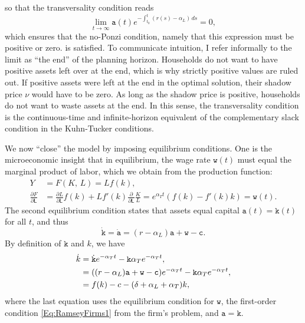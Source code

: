 \documentclass[10pt]{article}
\begin{document}
so that the transversality condition reads
\[
\lim_{t\to\infty} \mathtt{a}(t) e^{-\int_{t_0}^t (r(s)-\alpha_L)\, ds} = 0,
\]
which ensures that the no-Ponzi condition, namely that this expression must be positive or zero. is satisfied. To communicate intuition, I refer informally to the limit as ``the end'' of the planning horizon. Households do not want to have positive assets left over at the end, which is why strictly positive values are ruled out. If positive assets were left at the end in the optimal solution, their shadow price $\nu$ would have to be zero. As long as the shadow price is positive, households do not want to waste assets at the end. In this sense, the transversality condition is the continuous-time and infinite-horizon equivalent of the complementary slack condition in the Kuhn-Tucker conditions.

\smallskip

We now ``close'' the model by imposing equilibrium conditions.  One is the microeconomic insight that in equilibrium, the wage rate $\mathtt{w}(t)$ must equal the marginal product of labor, which we obtain from the production function:
\begin{align*}
Y &= F(K,\, L) = L f(k),\\
\frac{\partial F}{\partial \mathsf{L}} &= \frac{\partial L}{\partial \mathsf{L}} f(k) + L f'(k) \frac{\partial}{\partial\mathsf{L}} \frac{K}{L} = e^{\alpha_T t}(f(k)-f'(k)k) = \mathtt{w}(t).
\end{align*}
The second equilibrium condition states that assets equal capital $\mathtt{a}(t) = \mathtt{k}(t)$ for all $t$, and thus
\[
\dot{\mathtt{k}} = \dot{\mathtt{a}} = (r-\alpha_L) \mathtt{a} + \mathtt{w} - \mathtt{c}.
\]
By definition of $\mathtt{k}$ and $k$, we have
\begin{align}
\dot{k} &= \dot{\mathtt{k}} e^{-\alpha_T t} - \mathtt{k} \alpha_T e^{-\alpha_T t},\notag\\
 &= ((r-\alpha_L) \mathtt{a} + \mathtt{w} - \mathtt{c})e^{-\alpha_T t} - \mathtt{k} \alpha_T e^{-\alpha_T t},\notag\\
 &= f(k) - c - (\delta + \alpha_L + \alpha_T) k,\label{Eq:RamseyK}
\end{align}
where the last equation uses the equilibrium condition for $\mathtt{w}$, the first-order condition \eqref{Eq:RamseyFirms1} from the firm's problem, and $\mathtt{a}=\mathtt{k}$.

\smallskip
\end{document}
